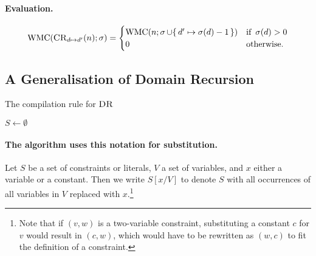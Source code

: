 \paragraph{Evaluation.}
\[
\operatorname{WMC}(\operatorname{\textsc{CR}}_{d \mapsto d'}(n); \operatorname{\sigma}) =
\begin{cases}
  \operatorname{WMC}(n; \operatorname{\sigma} \cup \{\, d' \mapsto \operatorname{\sigma}(d) - 1 \,\}) & \text{if } \operatorname{\sigma}(d) > 0 \\
  0 & \text{otherwise.}
\end{cases}
\]

\subsection{A Generalisation of Domain Recursion}

\begin{algorithm}[t]
  \caption{The compilation rule for $\operatorname{\textsc{DR}}$}
  \label{alg:domainrecursion}
  $S \gets \emptyset$\;
\end{algorithm}

\paragraph{The algorithm uses this notation for substitution.}
Let $S$ be a set of constraints or literals, $V$ a set of variables, and $x$ either a variable or a constant. Then we write $S[x/V]$ to denote $S$ with all occurrences of all variables in $V$ replaced with $x$.\footnote{Note that if $(v, w)$ is a two-variable constraint, substituting a constant $c$ for $v$ would result in $(c, w)$, which would have to be rewritten as $(w, c)$ to fit the definition of a constraint.}


